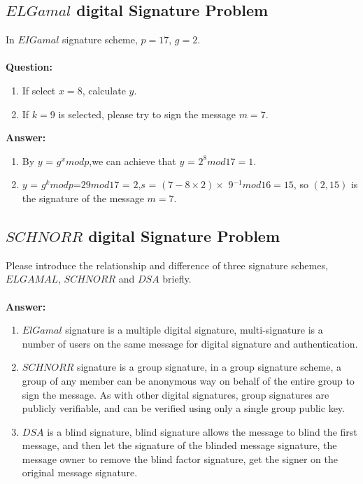 \documentclass[paper=a4, fontsize=11pt]{scrartcl} %
\numberwithin{equation}{section} %
\numberwithin{figure}{section} %
\numberwithin{table}{section} %
\begin{document}
\subsection{$ELGamal$ digital Signature Problem \uppercase\expandafter{}}

In $EIGamal$ signature scheme, $p = 17$, $g = 2$.
\\
\\
\textbf{Question:}
\begin{enumerate}
\item If select $x = 8$, calculate $y$.
\item If $k = 9$ is selected, please try to sign the message $m = 7$.
\end{enumerate}

\textbf{Answer:}
\begin{enumerate}
\item By $y$ = $g^x mod p$,we can achieve that $y$ = $2^8 mod 17 =1$.
\item $y$ = $g^k mod p$=$29 mod 17$ = $2$,$s$ = $(7-8 \times 2) \times$ $9$$^{-1} mod 16=15$, so $(2,15)$ is the signature of the message $m = 7$.
\end{enumerate}


\subsection{$SCHNORR$ digital Signature Problem \uppercase\expandafter{}}

Please introduce the relationship and difference of three signature schemes, $ELGAMAL$, $SCHNORR$ and $DSA$ briefly.
\\
\\
\textbf{Answer:}
\begin{enumerate}
\item $ElGamal$ signature is a multiple digital signature, multi-signature is a number of users on the same message for digital signature and authentication.
\item $SCHNORR$ signature is a group signature, in a group signature scheme, a group of any member can be anonymous way on behalf of the entire group to sign the message. As with other digital signatures, group signatures are publicly verifiable, and can be verified using only a single group public key.
\item $DSA$ is a blind signature, blind signature allows the message to blind the first message, and then let the signature of the blinded message signature, the message owner to remove the blind factor signature, get the signer on the original message signature.
\end{enumerate}
\end{document}
